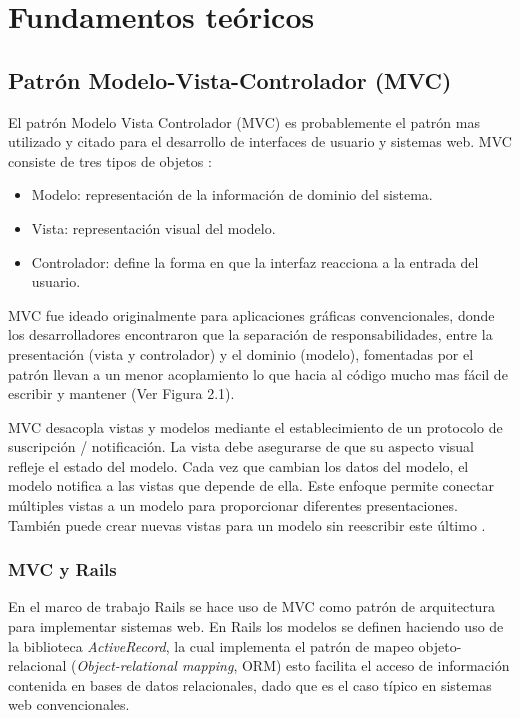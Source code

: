\chapter{Fundamentos teóricos}

\section{Patrón Modelo-Vista-Controlador (MVC)}
El patrón Modelo Vista Controlador (MVC) es probablemente el patrón
mas utilizado y citado para el desarrollo de interfaces de usuario y sistemas web.
MVC consiste de tres tipos de objetos \cite{22_martin_fowler_mvc}:

\begin{itemize}
\item Modelo: representación de la información de dominio del sistema.
\item Vista: representación visual del modelo.
\item Controlador: define la forma en que la interfaz reacciona a la entrada
  del usuario.
\end{itemize}


MVC fue ideado originalmente para aplicaciones gráficas convencionales,
donde los desarrolladores encontraron que la separación de responsabilidades,
entre la presentación (vista y controlador) y el dominio (modelo), fomentadas
por el patrón llevan a un menor acoplamiento lo que hacia al código
mucho mas fácil de escribir y mantener (Ver Figura 2.1).

MVC desacopla vistas y modelos mediante el establecimiento de un
protocolo de suscripción / notificación. La vista debe asegurarse
de que su aspecto visual refleje el estado del modelo. Cada vez que cambian
los datos del modelo, el modelo notifica a las vistas que depende de ella.
Este enfoque permite conectar múltiples vistas a un modelo para proporcionar
diferentes presentaciones. También puede crear nuevas vistas para un modelo
sin reescribir este último \cite{14_gamma_1995}.

\subsection{MVC y Rails}
En el marco de trabajo Rails se hace uso de MVC como patrón de arquitectura
para implementar sistemas web. En Rails los modelos se definen haciendo
uso de la biblioteca \textit{ActiveRecord}, la cual implementa el
patrón de mapeo objeto-relacional (\textit{Object-relational mapping},
ORM) esto facilita el acceso de información contenida en
bases de datos relacionales, dado que es el caso típico en sistemas web
convencionales.


